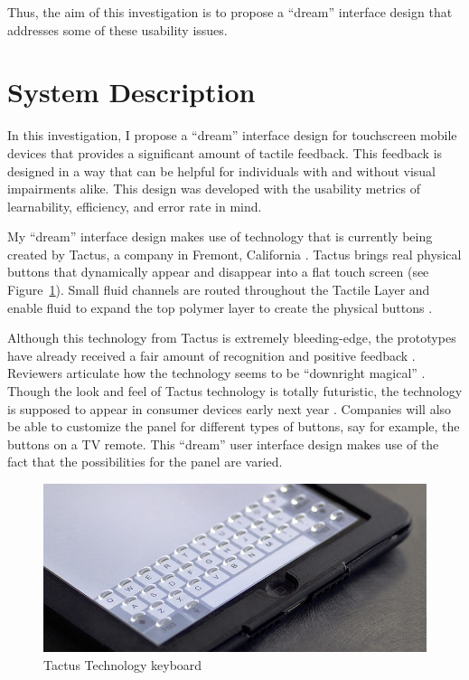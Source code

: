 \documentclass[11pt]{article}
\begin{document}
Thus, the aim of this investigation is to propose a ``dream'' interface design that addresses some of these usability issues.


\section{System Description}
\label{System Description}

In this investigation, I propose a ``dream'' interface design for touchscreen mobile devices that provides a significant amount of tactile feedback. This feedback is designed in a way that can be helpful for individuals with and without visual impairments alike. This design was developed with the usability metrics of learnability, efficiency, and error rate in mind.

My ``dream'' interface design makes use of technology that is currently being created by Tactus, a company in Fremont, California \cite{Tactus}. Tactus brings real physical buttons that dynamically appear and disappear into a flat touch screen (see Figure~\ref{tactus}). Small fluid channels are routed throughout the Tactile Layer and enable fluid to expand the top polymer layer to create the physical buttons \cite{Tactus}.

Although this technology from Tactus is extremely bleeding-edge, the prototypes have already received a fair amount of recognition and positive feedback \cite{CNN, I-Zone, PCMag, Wired}. Reviewers articulate how the technology seems to be ``downright magical'' \cite{CNN}. Though the look and feel of Tactus technology is totally futuristic, the technology is supposed to appear in consumer devices early next year \cite{Tactus}. Companies will also be able to customize the panel for different types of buttons, say for example, the buttons on a TV remote. This ``dream'' user interface design makes use of the fact that the possibilities for the panel are varied.

\begin{figure}[ht]
\centering
\includegraphics[width=4.5in]{tactus1.jpg} 
\caption{Tactus Technology keyboard}
\label{tactus}
\end{figure}
\end{document}
